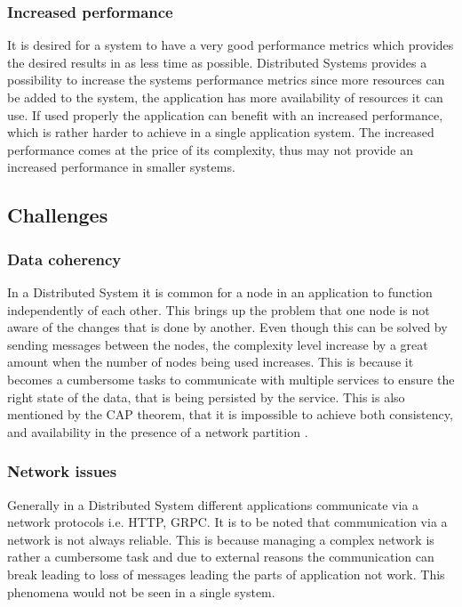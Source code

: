         \subsubsection{Increased performance}
        It is desired for a system to have a very good performance metrics which provides the desired results in as less time as possible.
        Distributed Systems provides a possibility to increase the systems performance metrics since more resources can be added to the system,
        the application has more availability of resources it can use. If used properly the application can benefit with an increased performance, 
        which is rather harder to achieve in a single application system. The increased performance comes at the price of its complexity, thus 
        may not provide an increased performance in smaller systems.
    
    \subsection{Challenges}    

        \subsubsection{Data coherency}
        In a Distributed System it is common for a node in an application to function independently of each other. This brings up the problem that
        one node is not aware of the changes that is done by another. Even though this can be solved by sending messages between the nodes, the complexity
        level increase by a great amount when the number of nodes being used increases. This is because it becomes a cumbersome tasks to communicate with
        multiple services to ensure the right state of the data, that is being persisted by the service. This is also mentioned by the CAP theorem, that it is
        impossible to achieve both consistency, and availability in the presence of a network partition \cite[p.~59]{CAP}.

        \subsubsection{Network issues}
        Generally in a Distributed System different applications communicate via a network protocols i.e. HTTP, GRPC. It is to be noted that
        communication via a network is not always reliable. This is because managing a complex network is rather a cumbersome task and due to
        external reasons the communication can break leading to loss of messages leading the parts of application not work. This phenomena would not be
        seen in a single system.

